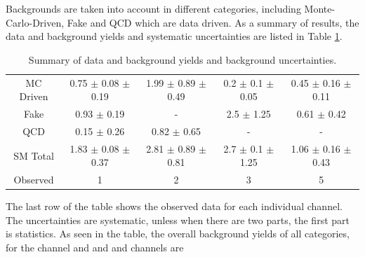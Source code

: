Backgrounds are taken into account in different categories, including Monte-Carlo-Driven, Fake and QCD which are data driven.
As a summary of results, the data and background yields and systematic uncertainties are listed in Table \ref{tbl:yieldSysSummary}. 
\begin{table}[h]
\begin{center}
\begin{tabular}{c|c|c|c|c}
\hline
\hline
		& \tauTau\binone & \tauTau\bintwo & \eTau\binone & \muTau\binone \\
\hline
MC Driven& 0.75 $\pm$ 0.08 $\pm$ 0.19 & 1.99 $\pm$ 0.89 $\pm$ 0.49  & 0.2 $\pm$ 0.1 $\pm$ 0.05 & 0.45 $\pm$ 0.16  $\pm$ 0.11\\
Fake    &     0.93 $\pm$ 0.19         &           -                 &     2.5 $\pm$ 1.25       &      0.61 $\pm$  0.42\\
QCD     &     0.15 $\pm$ 0.26         &         0.82 $\pm$ 0.65     &           -              &            -       \\
\hline
SM Total  & 1.83 $\pm$ 0.08 $\pm$ 0.37 & 2.81  $\pm$ 0.89 $\pm$0.81  & 2.7 $\pm$ 0.1 $\pm$ 1.25 & 1.06 $\pm$ 0.16  $\pm$ 0.43\\
\hline
\hline
Observed   & 1     & 2     & 3   & 5 \\  
\hline
\hline
\end{tabular}
\caption{Summary of data and background yields and background uncertainties.}
\label{tbl:yieldSysSummary}
\end{center}
\end{table}
The last row of the table shows the observed data for  each individual channel.  The uncertainties are systematic, unless when there are 
two parts, the first part is statistics.
As seen in the table, the overall background yields of all categories, 
for the \tauTau channel \binone and \bintwo and \eTau and \muTau channels are  
